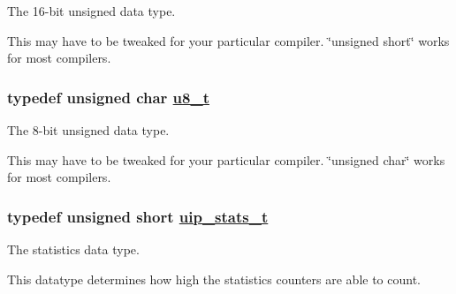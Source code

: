 The 16-bit unsigned data type. 

This may have to be tweaked for your particular compiler. \char`\"{}unsigned short\char`\"{} works for most compilers. \hypertarget{a00070_ge081489b4906f65a3cb18e9fbe9f8d23}{
\subsubsection[u8\_\-t]{\setlength{\rightskip}{0pt plus 5cm}typedef unsigned char \hyperlink{a00070_ge081489b4906f65a3cb18e9fbe9f8d23}{u8\_\-t}}}
\label{a00070_ge081489b4906f65a3cb18e9fbe9f8d23}


The 8-bit unsigned data type. 

This may have to be tweaked for your particular compiler. \char`\"{}unsigned char\char`\"{} works for most compilers. \hypertarget{a00070_g727459e5c4f777543c81ffffa3df3f0c}{
\subsubsection[uip\_\-stats\_\-t]{\setlength{\rightskip}{0pt plus 5cm}typedef unsigned short \hyperlink{a00070_g727459e5c4f777543c81ffffa3df3f0c}{uip\_\-stats\_\-t}}}
\label{a00070_g727459e5c4f777543c81ffffa3df3f0c}


The statistics data type. 

This datatype determines how high the statistics counters are able to count. 